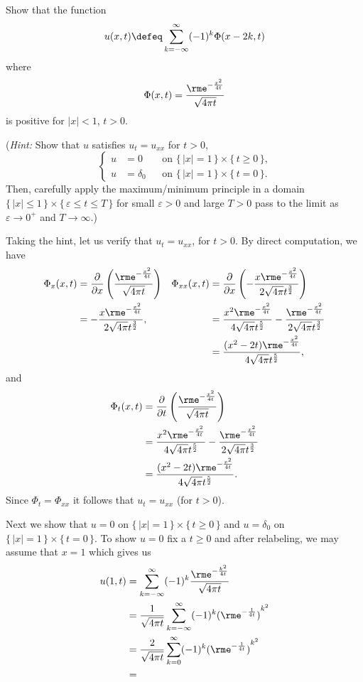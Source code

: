 \begin{problem}
  Show that the function
  \[
    u(x,t)\defeq\sum_{k=-\infty}^\infty (-1)^k\Phi(x-2k,t)
  \]
  where
  \[
    \Phi(x,t)=\frac{\rme^{-\frac{x^2}{4t}}}{\sqrt{4\pi t}}
  \]
  is positive for \(|x|<1\), \(t>0\).

  \noindent (\emph{Hint:} Show that \(u\) satisfies \(u_t=u_{xx}\) for
  \(t>0\),
  \[
    \left\{
      \begin{aligned}
        u&=0&&\text{on \(\{\,|x|=1\,\}\times\{\,t\geq 0\,\}\),}\\
        u&=\delta_0&&\text{on \(\{\,|x|=1\,\}\times\{\,t=0\,\}\).}
      \end{aligned}
    \right.
  \]
  Then, carefully apply the maximum/minimum principle in a domain
  \(\{\,|x|\leq 1\,\}\times\{\,\varepsilon\leq t\leq T\,\}\) for small
  \(\varepsilon>0\) and large \(T>0\) pass to the limit as \(\varepsilon\to
  0^+\) and \(T\to\infty\).)
\end{problem}
\begin{solution}
  Taking the hint, let us verify that \(u_t=u_{xx}\), for \(t>0\). By
  direct computation, we have
  \begin{align*}
    \Phi_x(x,t)
    &=\frac{\partial}{\partial x}
      \left(\frac{\rme^{-\frac{x^2}{4t}}}{\sqrt{4\pi t}}\right)
    &\Phi_{xx}(x,t)
    &=\frac{\partial}{\partial x}
      \left(-\frac{x\rme^{-\frac{x^2}{4t}}}{2\sqrt{4\pi}t^{\frac{3}{2}}}\right)\\
    &=-\frac{x\rme^{-\frac{x^2}{4t}}}{2\sqrt{4\pi}t^{\frac{3}{2}}},
    &&=\frac{x^2\rme^{-\frac{x^2}{4t}}}{4\sqrt{4\pi}t^{\frac{5}{2}}}
      -\frac{\rme^{-\frac{x^2}{4t}}}{2\sqrt{4\pi}t^{\frac{3}{2}}}
    \\
    &&&=\frac{(x^2-2t)\rme^{-\frac{x^2}{4t}}}{4\sqrt{4\pi}t^{\frac{5}{2}}},
  \end{align*}
  and
  \begin{align*}
    \Phi_t(x,t)
    &=\frac{\partial}{\partial t}
      \left(\frac{\rme^{-\frac{x^2}{4t}}}{\sqrt{4\pi t}}\right)\\
    &=\frac{x^2\rme^{-\frac{x^2}{4t}}}{4\sqrt{4\pi}t^{\frac{5}{2}}}
      -\frac{\rme^{-\frac{x^2}{4t}}}{2\sqrt{4\pi}t^{\frac{3}{2}}}\\
    &=\frac{(x^2-2t)\rme^{-\frac{x^2}{4t}}}{4\sqrt{4\pi}t^{\frac{5}{2}}}.
  \end{align*}
  Since \(\Phi_t=\Phi_{xx}\) it follows that \(u_t=u_{xx}\) (for \(t>0\)).

  Next we show that \(u=0\) on \(\{\,|x|=1\,\}\times\{\,t\geq 0\,\}\) and
  \(u=\delta_0\) on \(\{\,|x|=1\,\}\times\{\,t=0\,\}\). To show \(u=0\) fix
  a \(t\geq 0\) and after relabeling, we may assume that \(x=1\) which
  gives us
  \begin{align*}
    u(1,t)
    &=\sum_{k=-\infty}^\infty(-1)^k\frac{\rme^{-\frac{k^2}{4t}}}{\sqrt{4\pi
      t}}\\
    &=\frac{1}{\sqrt{4\pi t}}\sum_{k=-\infty}^\infty
      (-1)^k{(\rme^{-\frac{1}{4t}})}^{k^2}\\
    &=\frac{2}{\sqrt{4\pi t}}\sum_{k=0}^\infty
      (-1)^k{(\rme^{-\frac{1}{4t}})}^{k^2}\\
    &=
  \end{align*}
\end{solution}
